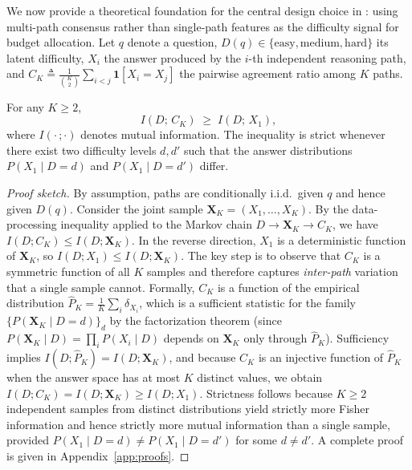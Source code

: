 
We now provide a theoretical foundation for the central design choice in
\method{}: using multi-path consensus rather than single-path features as
the difficulty signal for budget allocation.
Let $q$ denote a question, $D(q)\in\{\textrm{easy},\textrm{medium},\textrm{hard}\}$
its latent difficulty, $X_i$ the answer produced by the $i$-th independent
reasoning path, and
$C_K \triangleq \frac{1}{\binom{K}{2}}\sum_{i<j}\mathbf{1}[X_i = X_j]$
the pairwise agreement ratio among $K$ paths.

\begin{proposition}
\label{prop:info}
For any $K \ge 2$,
\begin{equation}
  I\!\left(D;\, C_K\right) \;\ge\; I\!\left(D;\, X_1\right),
  \label{eq:mi-bound}
\end{equation}
where $I(\cdot\,;\cdot)$ denotes mutual information.
The inequality is strict whenever there exist two difficulty levels
$d, d'$ such that the answer distributions $P(X_1\!\mid\! D\!=\!d)$
and $P(X_1\!\mid\! D\!=\!d')$ differ.
\end{proposition}

\begin{proof}[Proof sketch]
By assumption, paths are conditionally i.i.d.\ given $q$ and hence given
$D(q)$.
Consider the joint sample $\mathbf{X}_K = (X_1, \dots, X_K)$.
By the data-processing inequality applied to the Markov chain
$D \to \mathbf{X}_K \to C_K$, we have
$I(D; C_K) \le I(D; \mathbf{X}_K)$.
In the reverse direction, $X_1$ is a deterministic function of
$\mathbf{X}_K$, so
$I(D; X_1) \le I(D; \mathbf{X}_K)$.
The key step is to observe that $C_K$ is a symmetric function of all $K$
samples and therefore captures \emph{inter-path} variation that a single
sample cannot.
Formally, $C_K$ is a function of the empirical distribution
$\hat{P}_K = \frac{1}{K}\sum_i \delta_{X_i}$, which is a sufficient
statistic for the family
$\{P(\mathbf{X}_K \!\mid\! D\!=\!d)\}_{d}$ by the factorization theorem
(since $P(\mathbf{X}_K \!\mid\! D) = \prod_i P(X_i \!\mid\! D)$
depends on $\mathbf{X}_K$ only through $\hat{P}_K$).
Sufficiency implies $I(D; \hat{P}_K) = I(D; \mathbf{X}_K)$,
and because $C_K$ is an injective function of $\hat{P}_K$ when the answer
space has at most $K$ distinct values, we obtain
$I(D; C_K) = I(D; \mathbf{X}_K) \ge I(D; X_1)$.
Strictness follows because $K \ge 2$ independent samples from distinct
distributions yield strictly more Fisher information and hence strictly
more mutual information than a single sample, provided
$P(X_1 \!\mid\! D\!=\!d) \ne P(X_1 \!\mid\! D\!=\!d')$ for some
$d \ne d'$.
A complete proof is given in Appendix~\ref{app:proofs}.
\end{proof}


